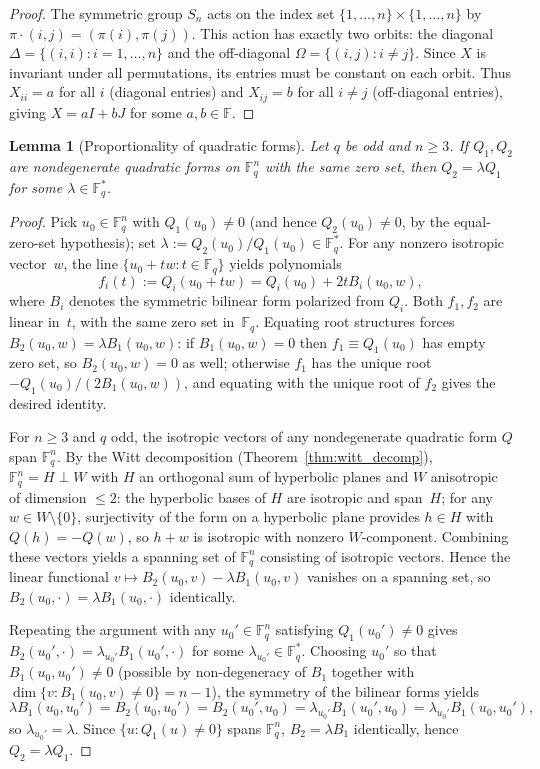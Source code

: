 \documentclass[11pt]{article}
\newcommand{\FF}{\mathbb{F}}
\newcommand{\0}{\mathbf{0}}
\newcommand{\1}{\mathbf{1}}
\theoremstyle{plain}
\newtheorem{lemma}[theorem]{Lemma}
\theoremstyle{definition}
\theoremstyle{remark}
\begin{document}
\begin{proof}
The symmetric group $S_n$ acts on the index set $\{1, \ldots, n\} \times \{1, \ldots, n\}$ by $\pi \cdot (i,j) = (\pi(i), \pi(j))$. This action has exactly two orbits: the diagonal $\Delta = \{(i,i) : i = 1, \ldots, n\}$ and the off-diagonal $\Omega = \{(i,j) : i \neq j\}$. Since $X$ is invariant under all permutations, its entries must be constant on each orbit. Thus $X_{ii} = a$ for all $i$ (diagonal entries) and $X_{ij} = b$ for all $i \neq j$ (off-diagonal entries), giving $X = aI + bJ$ for some $a, b \in \FF$.
\end{proof}

\begin{lemma}[Proportionality of quadratic forms]
\label{lem:quadratic_proportionality}
Let $q$ be odd and $n \geq 3$. If $Q_1, Q_2$ are nondegenerate quadratic forms on $\FF_q^n$ with the same zero set, then $Q_2 = \lambda Q_1$ for some $\lambda \in \FF_q^*$.
\end{lemma}
\begin{proof}
Pick $u_0 \in \FF_q^n$ with $Q_1(u_0) \neq 0$ (and hence $Q_2(u_0) \neq 0$, by the equal-zero-set hypothesis); set $\lambda := Q_2(u_0)/Q_1(u_0) \in \FF_q^*$. For any nonzero isotropic vector~$w$, the line $\{u_0 + t w : t \in \FF_q\}$ yields polynomials
\[
f_i(t) := Q_i(u_0 + t w) = Q_i(u_0) + 2 t B_i(u_0, w),
\]
where $B_i$ denotes the symmetric bilinear form polarized from $Q_i$. Both $f_1, f_2$ are linear in~$t$, with the same zero set in~$\FF_q$. Equating root structures forces $B_2(u_0, w) = \lambda B_1(u_0, w)$: if $B_1(u_0, w) = 0$ then $f_1 \equiv Q_1(u_0)$ has empty zero set, so $B_2(u_0, w) = 0$ as well; otherwise $f_1$ has the unique root $-Q_1(u_0)/(2 B_1(u_0, w))$, and equating with the unique root of $f_2$ gives the desired identity.

For $n \geq 3$ and $q$ odd, the isotropic vectors of any nondegenerate quadratic form $Q$ span $\FF_q^n$. By the Witt decomposition (Theorem~\ref{thm:witt_decomp}), $\FF_q^n = H \perp W$ with $H$ an orthogonal sum of hyperbolic planes and $W$ anisotropic of dimension $\leq 2$: the hyperbolic bases of $H$ are isotropic and span~$H$; for any $w \in W \setminus \{0\}$, surjectivity of the form on a hyperbolic plane provides $h \in H$ with $Q(h) = -Q(w)$, so $h + w$ is isotropic with nonzero $W$-component. Combining these vectors yields a spanning set of $\FF_q^n$ consisting of isotropic vectors. Hence the linear functional $v \mapsto B_2(u_0, v) - \lambda B_1(u_0, v)$ vanishes on a spanning set, so $B_2(u_0, \cdot) = \lambda B_1(u_0, \cdot)$ identically.

Repeating the argument with any $u_0' \in \FF_q^n$ satisfying $Q_1(u_0') \neq 0$ gives $B_2(u_0', \cdot) = \lambda_{u_0'} B_1(u_0', \cdot)$ for some $\lambda_{u_0'} \in \FF_q^*$. Choosing $u_0'$ so that $B_1(u_0, u_0') \neq 0$ (possible by non-degeneracy of $B_1$ together with $\dim\{v : B_1(u_0, v) \neq 0\} = n - 1$), the symmetry of the bilinear forms yields
\[
\lambda B_1(u_0, u_0') = B_2(u_0, u_0') = B_2(u_0', u_0) = \lambda_{u_0'} B_1(u_0', u_0) = \lambda_{u_0'} B_1(u_0, u_0'),
\]
so $\lambda_{u_0'} = \lambda$. Since $\{u : Q_1(u) \neq 0\}$ spans $\FF_q^n$, $B_2 = \lambda B_1$ identically, hence $Q_2 = \lambda Q_1$.
\end{proof}
\end{document}
